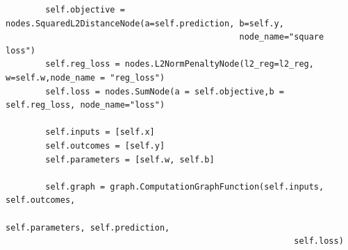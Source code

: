 \documentclass{article}
\theoremstyle{plain}
\theoremstyle{definition}
\begin{document}
\begin{enumerate}
\begin{verbatim}
        self.objective = nodes.SquaredL2DistanceNode(a=self.prediction, b=self.y,
                                               node_name="square loss")
        self.reg_loss = nodes.L2NormPenaltyNode(l2_reg=l2_reg, w=self.w,node_name = "reg_loss")
        self.loss = nodes.SumNode(a = self.objective,b = self.reg_loss, node_name="loss")
        
        self.inputs = [self.x]
        self.outcomes = [self.y]
        self.parameters = [self.w, self.b]

        self.graph = graph.ComputationGraphFunction(self.inputs, self.outcomes,
                                                          self.parameters, self.prediction,
                                                          self.loss)
\end{verbatim}


\end{enumerate}
\end{document}
